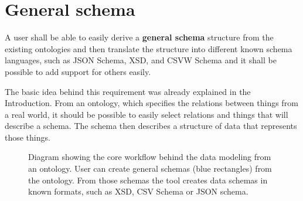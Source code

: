 \section{General schema}

\begin{requirement}
A user shall be able to easily derive a \textbf{general schema} structure from the existing ontologies and then translate the structure into different known schema languages, such as JSON Schema, XSD, and CSVW Schema and it shall be possible to add support for others easily.
\label{requirement:general-schema}
\end{requirement}

The basic idea behind this requirement was already explained in the Introduction. From an ontology, which specifies the relations between things from a real world, it should be possible to easily select relations and things that will describe a schema. The schema then describes a structure of data that represents those things.

\begin{figure}[h!]\centering
  \caption{Diagram showing the core workflow behind the data modeling from an ontology. User can create general schemas (blue rectangles) from the ontology. From those schemas the tool creates data schemas in known formats, such as XSD, CSV Schema or JSON schema.}
\end{figure}

